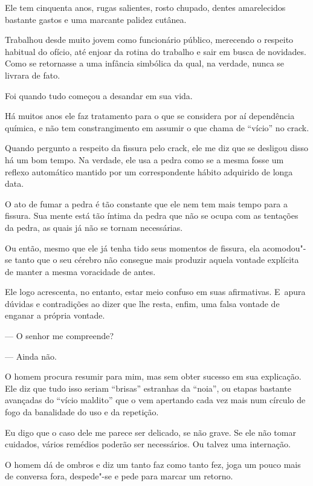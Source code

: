  

Ele tem cinquenta anos, rugas salientes, rosto chupado, dentes
amarelecidos bastante gastos e uma marcante palidez cutânea.

Trabalhou desde muito jovem como funcionário público, merecendo o
respeito habitual do ofício, até enjoar da rotina do trabalho e sair em
busca de novidades. Como se retornasse a uma infância simbólica da qual,
na verdade, nunca se livrara de fato.

Foi quando tudo começou a desandar em sua vida.

Há muitos anos ele faz tratamento para o que se considera por aí
dependência química, e não tem constrangimento em assumir o que chama de
``vício'' no crack.

Quando pergunto a respeito da fissura pelo crack, ele me diz que se
desligou disso há um bom tempo. Na verdade, ele usa a pedra como se a
mesma fosse um reflexo automático mantido por um correspondente hábito
adquirido de longa data.

O ato de fumar a pedra é tão constante que ele nem tem mais tempo para a
fissura. Sua mente está tão íntima da pedra que não se ocupa com as
tentações da pedra, as quais já não se tornam necessárias.

Ou então, mesmo que ele já tenha tido seus momentos de fissura, ela
acomodou"-se tanto que o seu cérebro não consegue mais produzir aquela
vontade explícita de manter a mesma voracidade de antes.

Ele logo acrescenta, no entanto, estar meio confuso em suas afirmativas.
E~apura dúvidas e contradições ao dizer que lhe resta, enfim, uma falsa
vontade de enganar a própria vontade.

— O senhor me compreende?

— Ainda não.

O homem procura resumir para mim, mas sem obter sucesso em sua
explicação. Ele diz que tudo isso seriam ``brisas'' estranhas da
``noia'', ou etapas bastante avançadas do ``vício maldito'' que o vem
apertando cada vez mais num círculo de fogo da banalidade do uso e da
repetição.

Eu digo que o caso dele me parece ser delicado, se não grave. Se ele não
tomar cuidados, vários remédios poderão ser necessários. Ou talvez uma
internação.

O homem dá de ombros e diz um tanto faz como tanto fez, joga um pouco
mais de conversa fora, despede"-se e pede para marcar um retorno.

